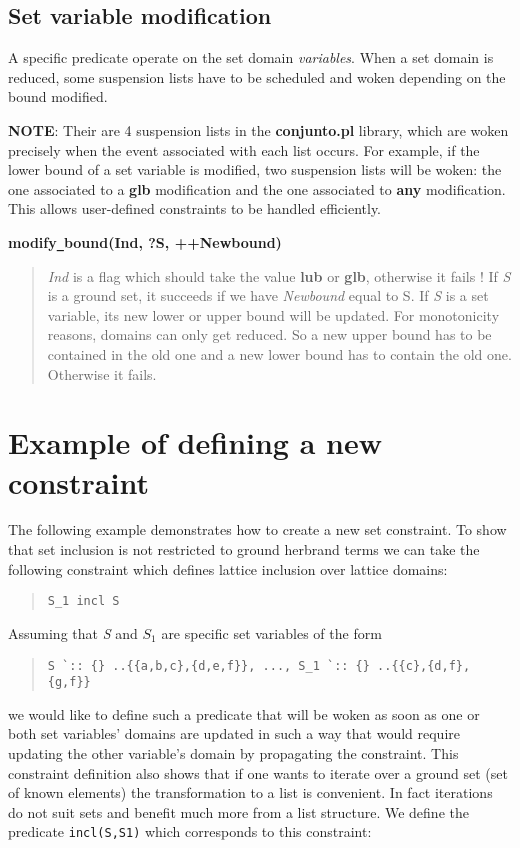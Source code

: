 \subsection{Set variable modification}
A specific predicate operate on the set domain {\em variables}.
When a set domain is reduced, some suspension lists have to be
scheduled and woken depending on the bound modified. 

{\bf NOTE}: Their are 4 suspension lists in the {\bf conjunto.pl}
library, which are woken precisely when the event associated with each
list occurs. For example, if the lower bound of a set variable is modified, two
suspension lists will be woken: the one associated to a {\bf glb}
modification and the one associated to {\bf any} modification. This
allows user-defined constraints to be handled efficiently. 

\noindent
{\bf modify\verb/_/bound(Ind, ?S, ++Newbound)}
\begin{quote}
{\em Ind} is a flag which should take the value {\bf lub} or {\bf glb},
otherwise it fails ! If {\em S} is a ground set, it succeeds if we
have {\em Newbound} equal to S. If {\em S} is a set variable, its new
lower or upper bound will be updated. For monotonicity reasons,
domains can only get reduced. So a new upper bound has to be contained
in the old one and a new lower bound has to contain the old one.
Otherwise it fails.
\end{quote}

\section{Example of defining a new constraint}

The following example demonstrates how to create a new set constraint. To
show that set inclusion is not restricted to ground herbrand terms we
can take the following constraint which defines lattice inclusion over
lattice domains:
\begin{quote}\begin{verbatim}
S_1 incl S
\end{verbatim}\end{quote}
Assuming that {\em S} and $S_1$ are specific set variables of the form
\begin{quote}\begin{verbatim}
S `:: {} ..{{a,b,c},{d,e,f}}, ..., S_1 `:: {} ..{{c},{d,f},{g,f}}
\end{verbatim}\end{quote}
we would like to define such a predicate
that will be woken as soon as one or both set variables' domains are
updated in such a way that would require updating the other variable's
domain by propagating the constraint. This constraint definition also
shows that if one wants to iterate over a ground set (set of known
elements) the transformation to a list is convenient. In fact
iterations do not suit sets and benefit much more from a list
structure. We define the predicate \verb/incl(S,S1)/ which corresponds
to this constraint:

